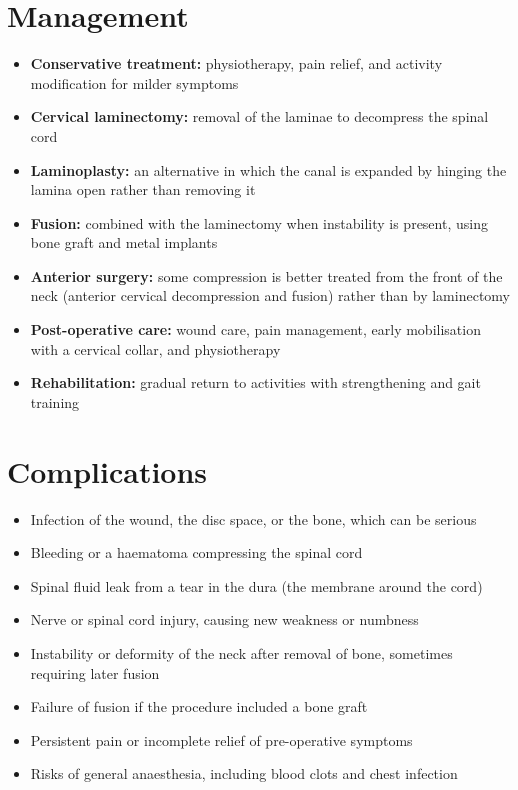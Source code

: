 \section*{Management}
\begin{itemize}
    \item \textbf{Conservative treatment:} physiotherapy, pain relief, and activity modification for milder symptoms
    \item \textbf{Cervical laminectomy:} removal of the laminae to decompress the spinal cord
    \item \textbf{Laminoplasty:} an alternative in which the canal is expanded by hinging the lamina open rather than removing it
    \item \textbf{Fusion:} combined with the laminectomy when instability is present, using bone graft and metal implants
    \item \textbf{Anterior surgery:} some compression is better treated from the front of the neck (anterior cervical decompression and fusion) rather than by laminectomy
    \item \textbf{Post-operative care:} wound care, pain management, early mobilisation with a cervical collar, and physiotherapy
    \item \textbf{Rehabilitation:} gradual return to activities with strengthening and gait training
\end{itemize}

\section*{Complications}
\begin{itemize}
    \item Infection of the wound, the disc space, or the bone, which can be serious
    \item Bleeding or a haematoma compressing the spinal cord
    \item Spinal fluid leak from a tear in the dura (the membrane around the cord)
    \item Nerve or spinal cord injury, causing new weakness or numbness
    \item Instability or deformity of the neck after removal of bone, sometimes requiring later fusion
    \item Failure of fusion if the procedure included a bone graft
    \item Persistent pain or incomplete relief of pre-operative symptoms
    \item Risks of general anaesthesia, including blood clots and chest infection
\end{itemize}

